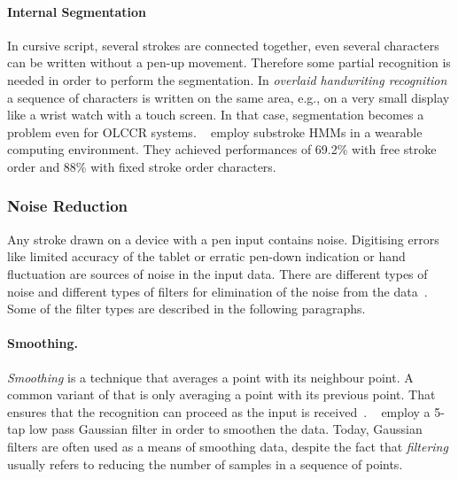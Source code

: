 \paragraph{Internal Segmentation}
\label{sec:internalsegmentation}
In cursive script, several strokes are connected together, even several 
characters can be written without a pen-up movement. Therefore some partial 
recognition is needed in order to perform the segmentation.
In \emph{overlaid handwriting recognition} a sequence of characters is written 
on the same area, e.g., on a very small display like a wrist watch with a touch 
screen. In that case, segmentation becomes a problem even for OLCCR systems.
~\citeyear{Shimodaira2003} employ substroke HMMs in a wearable computing 
environment. They achieved performances of 69.2\% with free stroke order
and 88\% with fixed stroke order characters.

\subsubsection{Noise Reduction} 
\label{sec:noisereduction}
Any stroke drawn on a device with a pen input contains noise. Digitising errors
like limited accuracy of the tablet or erratic pen-down indication or hand 
fluctuation are sources of noise in the input data.  There are different types 
of noise and different types of filters for elimination of the noise from the 
data~. Some of the filter types are described in the 
following paragraphs.

\paragraph{Smoothing.}
\label{sec:smoothing}
\emph{Smoothing} is a technique that averages a point with its 
neighbour point. A common variant of that is only averaging a point with its
previous point. That ensures that the recognition can proceed as the input
is received~. 
~\citeyear{Joshi2005} employ a 5-tap low 
pass Gaussian filter in order to smoothen the data. Today, Gaussian filters are 
often used as a means of smoothing data, despite the fact that \emph{filtering}
usually refers to reducing the number of samples in a sequence of points.

